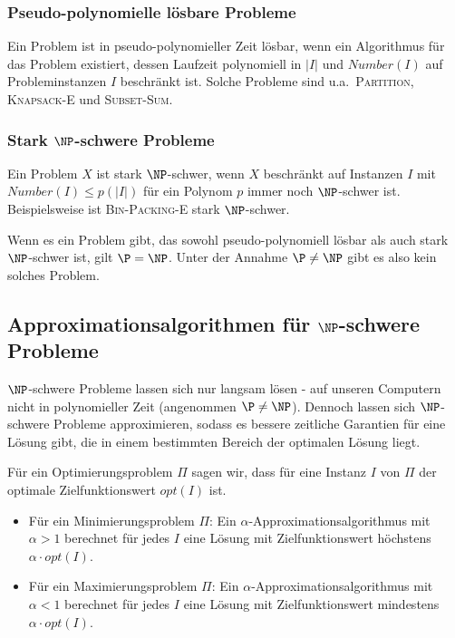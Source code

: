 \documentclass[a4paper,parskip=half*,DIV=7,fontsize=11pt]{scrartcl}
\begin{document}
\subsubsection{Pseudo-polynomielle lösbare Probleme}
Ein Problem ist in pseudo-polynomieller Zeit lösbar, wenn ein Algorithmus für das Problem existiert, dessen Laufzeit polynomiell in $\vert I \vert$ und $Number(I)$ auf Probleminstanzen $I$ beschränkt ist. Solche Probleme sind u.a.\ \textsc{Partition}, \textsc{Knapsack-E} und \textsc{Subset-Sum}.

\subsubsection{Stark $\NP$-schwere Probleme}
Ein Problem $X$ ist stark $\NP$-schwer, wenn $X$ beschränkt auf Instanzen $I$ mit $Number(I)\leq p(\vert I \vert)$ für ein Polynom $p$ immer noch $\NP$-schwer ist. Beispielsweise ist \textsc{Bin-Packing-E} stark $\NP$-schwer.

Wenn es ein Problem gibt, das sowohl pseudo-polynomiell lösbar als auch stark $\NP$-schwer ist, gilt $\P=\NP$. Unter der Annahme $\P\neq\NP$ gibt es also kein solches Problem.

\subsection[Approximationsalgorithmen für NP-schwere Probleme]{Approximationsalgorithmen für $\NP$-schwere Probleme}
$\NP$-schwere Probleme lassen sich nur langsam lösen - auf unseren Computern nicht in polynomieller Zeit (angenommen $\P \neq \NP$). Dennoch lassen sich $\NP$-schwere Probleme approximieren, sodass es bessere zeitliche Garantien für eine Lösung gibt, die in einem bestimmten Bereich der optimalen Lösung liegt.

Für ein Optimierungsproblem $\Pi$ sagen wir, dass für eine Instanz $I$ von $\Pi$ der optimale Zielfunktionswert $opt(I)$ ist.

\begin{itemize}
\item Für ein Minimierungsproblem $\Pi$: Ein $\alpha$-Approximationsalgorithmus mit $\alpha > 1$ berechnet für jedes $I$ eine Lösung mit Zielfunktionswert höchstens $\alpha \cdot opt(I)$.
\item Für ein Maximierungsproblem $\Pi$: Ein $\alpha$-Approximationsalgorithmus mit $\alpha < 1$ berechnet für jedes $I$ eine Lösung mit Zielfunktionswert mindestens $\alpha \cdot opt(I)$.
\end{itemize}
\end{document}
